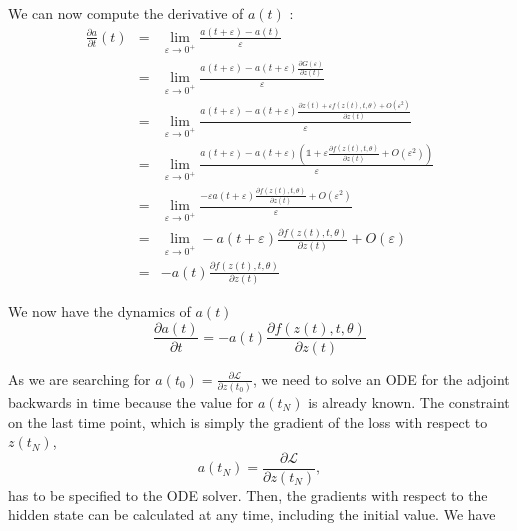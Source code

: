 \documentclass[10pt,a4paper]{article}
\theoremstyle{definition}
\theoremstyle{plain}
\begin{document}
We can now compute the derivative of $a(t)$ :
\begin{eqnarray*}
\frac{\partial a}{\partial t}(t) &=& \lim_{\varepsilon \rightarrow 0^+} \frac{a(t+\varepsilon) - a(t)}{\varepsilon}\\
&=& \lim_{\varepsilon \rightarrow 0^+} \frac{a(t+\varepsilon) - a(t+\varepsilon)\frac{\partial G(\varepsilon)}{\partial z(t)}}{\varepsilon}\\
&=& \lim_{\varepsilon \rightarrow 0^+} \frac{a(t+\varepsilon) - a(t+\varepsilon)\frac{\partial z(t) + \varepsilon f(z(t),t,\theta) + O(\varepsilon^2)}{\partial z(t)}}{\varepsilon} \\
&=& \lim_{\varepsilon \rightarrow 0^+} \frac{a(t+\varepsilon) - a(t+\varepsilon)(\mathds{1} + \varepsilon \frac{\partial f(z(t),t,\theta)} {\partial z(t)}+ O(\varepsilon^2))}{\varepsilon}\\
&=& \lim_{\varepsilon \rightarrow 0^+} \frac{-\varepsilon a(t+\varepsilon) \frac{\partial f(z(t),t,\theta)} {\partial z(t)}+ O(\varepsilon^2)}{\varepsilon}\\
&=& \lim_{\varepsilon \rightarrow 0^+} - a(t+\varepsilon) \frac{\partial f(z(t),t,\theta)} {\partial z(t)}+ O(\varepsilon)\\
&=& -a(t)\frac{\partial f(z(t),t,\theta)} {\partial z(t)}
\end{eqnarray*}

We now have the dynamics of $a(t)$
\begin{equation}
\label{dynat}
\frac{\partial a(t)}{\partial t} = -a(t)\frac{\partial f(z(t),t,\theta)} {\partial z(t)}
\end{equation}
 
As we are searching for $ a(t_0) = \frac{\partial \mathcal{L}}{\partial z(t_0)}$, we need to solve an ODE for the adjoint backwards in time because the value for $a(t_N)$ is already known. The constraint on the last time point, which is simply the gradient of the loss with respect to $z(t_N)$, 
\begin{equation*}
a(t_N) = \frac{\partial \mathcal{L}}{\partial z(t_N)},
\end{equation*}
has to be specified to the ODE solver. Then, the gradients with respect to the hidden state can be calculated at any time, including the initial value. We have 
\end{document}
